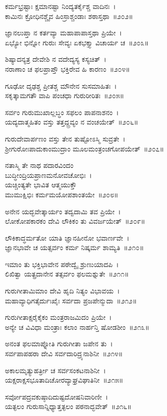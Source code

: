 ಕರ್ಮಭ್ರಷ್ಟಾಃ ಕ್ಷಮಾನಷ್ಟಾ ನಿಂದ್ಯತರ್ಕೈಶ್ಚ ವಾದಿನಃ~।\\
ಕಾಮಿನಃ ಕ್ರೋಧಿನಶ್ಚೈವ ಹಿಂಸ್ರಾಶ್ಚಂಡಾಃ ಶಠಾಸ್ತಥಾ~॥೨೦೨॥

ಜ್ಞಾನಲುಪ್ತಾ ನ ಕರ್ತವ್ಯಾ ಮಹಾಪಾಪಾಸ್ತಥಾ ಪ್ರಿಯೇ~।\\
ಏಭ್ಯೋ ಭಿನ್ನೋ ಗುರುಃ ಸೇವ್ಯಃ ಏಕಭಕ್ತ್ಯಾ ವಿಚಾರ್ಯ ಚ~॥೨೦೩॥

ಶಿಷ್ಯಾದನ್ಯತ್ರ ದೇವೇಶಿ ನ ವದೇದ್ಯಸ್ಯ ಕಸ್ಯಚಿತ್~।\\
ನರಾಣಾಂ ಚ ಫಲಪ್ರಾಪ್ತೌ ಭಕ್ತಿರೇವ ಹಿ ಕಾರಣಂ~॥೨೦೪॥

ಗೂಢೋ ದೃಢಶ್ಚ ಪ್ರೀತಶ್ಚ ಮೌನೇನ ಸುಸಮಾಹಿತಃ~।\\
ಸಕೃತ್ಕಾಮಗತೌ ವಾಪಿ ಪಂಚಧಾ ಗುರುರೀರಿತಃ~॥೨೦೫॥

ಸರ್ವಂ ಗುರುಮುಖಾಲ್ಲಬ್ಧಂ ಸಫಲಂ ಪಾಪನಾಶನಂ~।\\
ಯದ್ಯದಾತ್ಮಹಿತಂ ವಸ್ತು ತತ್ತದ್ದ್ರವ್ಯಂ ನ ವಂಚಯೇತ್~॥೨೦೬॥

ಗುರುದೇವಾರ್ಪಣಂ ವಸ್ತು ತೇನ ತುಷ್ಟೋಽಸ್ಮಿ ಸುವ್ರತೇ~।\\
ಶ್ರೀಗುರೋಃಪಾದುಕಾಂಮುದ್ರಾಂ ಮೂಲಮಂತ್ರಂಚಗೋಪಯೇತ್~॥೨೦೭॥

ನತಾಸ್ಮಿ ತೇ ನಾಥ ಪದಾರವಿಂದಂ\\ ಬುದ್ಧೀಂದ್ರಿಯಪ್ರಾಣಮನೋವಚೋಭಿಃ~।\\
ಯಚ್ಚಿಂತ್ಯತೇ ಭಾವಿತ ಆತ್ಮಯುಕ್ತೌ\\ ಮುಮುಕ್ಷಿಭಿಃ ಕರ್ಮಮಯೋಪಶಾಂತಯೇ~॥೨೦೮॥

ಅನೇನ ಯದ್ಭವೇತ್ಕಾರ್ಯಂ ತದ್ವದಾಮಿ ತವ ಪ್ರಿಯೇ~।\\
ಲೋಕೋಪಕಾರಕಂ ದೇವಿ ಲೌಕಿಕಂ ತು ವಿವರ್ಜಯೇತ್~॥೨೦೯॥

ಲೌಕಿಕಾದ್ಧರ್ಮತೋ ಯಾತಿ ಜ್ಞಾನಹೀನೋ ಭವಾರ್ಣವೇ~।\\
ಜ್ಞಾನಭಾವೇ ಚ ಯತ್ಸರ್ವಂ ಕರ್ಮ ನಿಷ್ಕರ್ಮ ಶಾಮ್ಯತಿ~॥೨೧೦॥

ಇಮಾಂ ತು ಭಕ್ತಿಭಾವೇನ ಪಠೇದ್ವೈ ಶ್ರುಣುಯಾದಪಿ~।\\
ಲಿಖಿತ್ವಾ ಯತ್ಪ್ರದಾನೇನ ತತ್ಸರ್ವಂ ಫಲಮಶ್ನುತೇ~॥೨೧೧॥

ಗುರುಗೀತಾಮಿಮಾಂ ದೇವಿ ಹೃದಿ ನಿತ್ಯಂ ವಿಭಾವಯ~।\\
ಮಹಾವ್ಯಾಧಿಗತೈರ್ದುಃಖೈಃ ಸರ್ವದಾ ಪ್ರಜಪೇನ್ಮುದಾ~॥೨೧೨॥

ಗುರುಗೀತಾಕ್ಷರೈಕೈಕಂ ಮಂತ್ರರಾಜಮಿದಂ ಪ್ರಿಯೇ~।\\
ಅನ್ಯೇ ಚ ವಿವಿಧಾ ಮಂತ್ರಾಃ ಕಲಾಂ ನಾರ್ಹನ್ತಿ ಷೋಡಶೀಂ~॥೨೧೩॥

ಅನಂತ ಫಲಮಾಪ್ನೋತಿ ಗುರುಗೀತಾ ಜಪೇನ ತು~।\\
ಸರ್ವಪಾಪಹರಾ ದೇವಿ ಸರ್ವದಾರಿದ್ರ್ಯನಾಶಿನೀ~॥೨೧೪॥

ಅಕಾಲಮೃತ್ಯುಹರ್ತ್ರೀ ಚ ಸರ್ವಸಂಕಟನಾಶಿನೀ~।\\
ಯಕ್ಷರಾಕ್ಷಸಭೂತಾದಿಚೋರವ್ಯಾಘ್ರವಿಘಾತಿನೀ~॥೨೧೫॥

ಸರ್ವೋಪದ್ರವಕುಷ್ಠಾದಿದುಷ್ಟದೋಷನಿವಾರಿಣೀ~।\\
ಯತ್ಫಲಂ ಗುರುಸಾನ್ನಿಧ್ಯಾತ್ತತ್ಫಲಂ ಪಠನಾದ್ಭವೇತ್~॥೨೧೬॥

